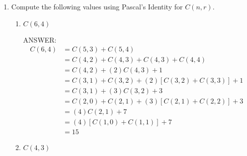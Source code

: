 \documentclass[12pt]{article}
\newcommand\buf{\vspace{0.10in}}
\newenvironment{answer}{\fontfamily{ptm}\selectfont \smaller[1] ANSWER: }{}
\begin{document}
\begin{enumerate}
\begin{enumerate}
    \item $(s+t)^{5}$
    \buf

    \begin{answer}
        We can apply the binomial theorem to find the expansion.
        \begin{align*}
            (x+y)^{5} &= \sum_{j=0}^{5} C(5, j) x^{5-j} y^{j} \\
            &= C(5, 0)x^{5} + C(5, 1)x^{4}y + C(5, 2)x^{3}y^{2} + C(5, 3)x^{2}y^{3} \\
            &+ C(5, 4)xy^{4} + C(5, 5)y^{5} \\
            &= x^{5} + 5x^{4}y + 10x^{3}y^{2} + 10x^{2}y^{3} + 5xy^{4} + y^{5}
        \end{align*}
    \end{answer}
    \buf

\end{enumerate}


\item Compute the following values using Pascal's Identity for $C(n, r)$.

\begin{enumerate}

    \item $C(6, 4)$
    \buf

    \begin{answer}
        \begin{align*}
            C(6, 4) &= C(5, 3) + C(5, 4) \\
            &= C(4, 2) + C(4, 3) + C(4, 3) + C(4, 4) \\
            &= C(4, 2) + (2)C(4, 3) + 1 \\
            &= C(3, 1) + C(3, 2) + (2)[C(3, 2) + C(3, 3)] + 1 \\
            &= C(3, 1) + (3)C(3, 2) + 3 \\
            &= C(2, 0) + C(2, 1) + (3)[C(2, 1) + C(2, 2)] + 3 \\
            &= (4)C(2, 1) + 7 \\
            &= (4)[C(1, 0) + C(1, 1)] + 7 \\
            &= 15
        \end{align*}
    \end{answer}
    \buf

    \item $C(4, 3)$
    \buf


\end{enumerate}
\end{enumerate}
\end{document}
